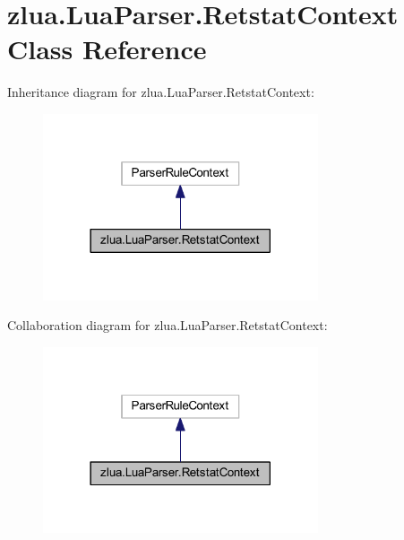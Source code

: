 \hypertarget{classzlua_1_1_lua_parser_1_1_retstat_context}{}\section{zlua.\+Lua\+Parser.\+Retstat\+Context Class Reference}
\label{classzlua_1_1_lua_parser_1_1_retstat_context}


Inheritance diagram for zlua.\+Lua\+Parser.\+Retstat\+Context\+:
\nopagebreak
\begin{figure}[H]
\begin{center}
\leavevmode
\includegraphics[width=230pt]{classzlua_1_1_lua_parser_1_1_retstat_context__inherit__graph}
\end{center}
\end{figure}


Collaboration diagram for zlua.\+Lua\+Parser.\+Retstat\+Context\+:
\nopagebreak
\begin{figure}[H]
\begin{center}
\leavevmode
\includegraphics[width=230pt]{classzlua_1_1_lua_parser_1_1_retstat_context__coll__graph}
\end{center}
\end{figure}
